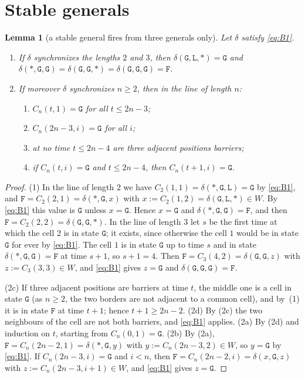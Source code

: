 \documentclass[11pt]{article}
\newtheorem{lemma}{Lemma}
\theoremstyle{remark}
\newcommand{\Lq}{\mathtt{L}}\newcommand{\Gq}{\mathtt{G}}\newcommand{\Aq}{\mathtt{A}}\newcommand{\Bq}{\mathtt{B}}\newcommand{\Fq}{\mathtt{F}}
\begin{document}
\section{Stable generals}

\begin{lemma}[a stable general fires from three generals only]\label{lem:fire}
Let $\delta$ satisfy \eqref{eq:B1}.
\begin{enumerate}[label=\textup{(\arabic*)}]
\item If $\delta$ synchronizes the lengths $2$ and $3$, then $\delta(\Gq,\Lq,\ast)=\Gq$ and
$\delta(\ast,\Gq,\Gq)=\delta(\Gq,\Gq,\ast)=\delta(\Gq,\Gq,\Gq)=\Fq$.
\item If moreover $\delta$ synchronizes $n\ge2$, then in the line of length $n$:
\begin{enumerate}[label=\textup{(\alph*)}]
\item $C_n(t,1)=\Gq$ for all $t\le 2n-3$;
\item $C_n(2n-3,i)=\Gq$ for all $i$;
\item at no time $t\le 2n-4$ are three adjacent positions barriers;
\item if $C_n(t,i)=\Gq$ and $t\le 2n-4$, then $C_n(t+1,i)=\Gq$.
\end{enumerate}
\end{enumerate}
\end{lemma}

\begin{proof}
(1) In the line of length $2$ we have $C_2(1,1)=\delta(\ast,\Gq,\Lq)=\Gq$ by \eqref{eq:B1}, and
$\Fq=C_2(2,1)=\delta(\ast,\Gq,x)$ with $x:=C_2(1,2)=\delta(\Gq,\Lq,\ast)\in W$. By \eqref{eq:B1} this value is
$\Gq$ unless $x=\Gq$. Hence $x=\Gq$ and $\delta(\ast,\Gq,\Gq)=\Fq$, and then
$\Fq=C_2(2,2)=\delta(\Gq,\Gq,\ast)$. In the line of length $3$ let $s$ be the first time at which the cell $2$ is
in state $\Gq$; it exists, since otherwise the cell $1$ would be in state $\Gq$ for ever by \eqref{eq:B1}. The
cell $1$ is in state $\Gq$ up to time $s$ and in state $\delta(\ast,\Gq,\Gq)=\Fq$ at time $s+1$, so $s+1=4$.
Then $\Fq=C_3(4,2)=\delta(\Gq,\Gq,z)$ with $z:=C_3(3,3)\in W$, and \eqref{eq:B1} gives $z=\Gq$ and
$\delta(\Gq,\Gq,\Gq)=\Fq$.

(2c) If three adjacent positions are barriers at time $t$, the middle one is a cell in state $\Gq$ (as $n\ge2$,
the two borders are not adjacent to a common cell), and by~(1) it is in state $\Fq$ at time $t+1$; hence
$t+1\ge 2n-2$.
(2d) By (2c) the two neighbours of the cell are not both barriers, and \eqref{eq:B1} applies.
(2a) By (2d) and induction on $t$, starting from $C_n(0,1)=\Gq$.
(2b) By (2a), $\Fq=C_n(2n-2,1)=\delta(\ast,\Gq,y)$ with $y:=C_n(2n-3,2)\in W$, so $y=\Gq$ by \eqref{eq:B1}.
If $C_n(2n-3,i)=\Gq$ and $i<n$, then $\Fq=C_n(2n-2,i)=\delta(x,\Gq,z)$ with $z:=C_n(2n-3,i+1)\in W$, and
\eqref{eq:B1} gives $z=\Gq$.
\end{proof}
\end{document}
